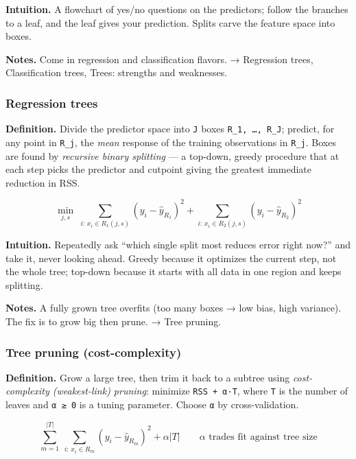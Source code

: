 \documentclass[
  10pt,
  letterpaper,
  onecolumn]{article}
\begin{document}
\textbf{Intuition.} A flowchart of yes/no questions on the predictors;
follow the branches to a leaf, and the leaf gives your prediction.
Splits carve the feature space into boxes.

\textbf{Notes.} Come in regression and classification flavors. →
Regression trees, Classification trees, Trees: strengths and weaknesses.

\hypertarget{regression-trees}{%
\subsubsection{Regression trees}\label{regression-trees}}

\textbf{Definition.} Divide the predictor space into \texttt{J} boxes
\texttt{R\_1,\ …,\ R\_J}; predict, for any point in \texttt{R\_j}, the
\emph{mean} response of the training observations in \texttt{R\_j}.
Boxes are found by \emph{recursive binary splitting} --- a top-down,
greedy procedure that at each step picks the predictor and cutpoint
giving the greatest immediate reduction in RSS.

\begin{equation*}
\min_{j,s}\;\sum_{i:\,x_i\in R_1(j,s)}(y_i-\hat y_{R_1})^2+\sum_{i:\,x_i\in R_2(j,s)}(y_i-\hat y_{R_2})^2
\end{equation*}

\textbf{Intuition.} Repeatedly ask ``which single split most reduces
error right now?'' and take it, never looking ahead. Greedy because it
optimizes the current step, not the whole tree; top-down because it
starts with all data in one region and keeps splitting.

\textbf{Notes.} A fully grown tree overfits (too many boxes → low bias,
high variance). The fix is to grow big then prune. → Tree pruning.

\hypertarget{tree-pruning-cost-complexity}{%
\subsubsection{Tree pruning
(cost-complexity)}\label{tree-pruning-cost-complexity}}

\textbf{Definition.} Grow a large tree, then trim it back to a subtree
using \emph{cost-complexity (weakest-link) pruning}: minimize
\texttt{RSS\ +\ α·\textbar{}T\textbar{}}, where
\texttt{\textbar{}T\textbar{}} is the number of leaves and
\texttt{α\ ≥\ 0} is a tuning parameter. Choose \texttt{α} by
cross-validation.

\begin{equation*}
\sum_{m=1}^{|T|}\ \sum_{i:\,x_i\in R_m}(y_i-\hat y_{R_m})^2+\alpha|T|
\qquad \alpha \text{ trades fit against tree size}
\end{equation*}
\end{document}
